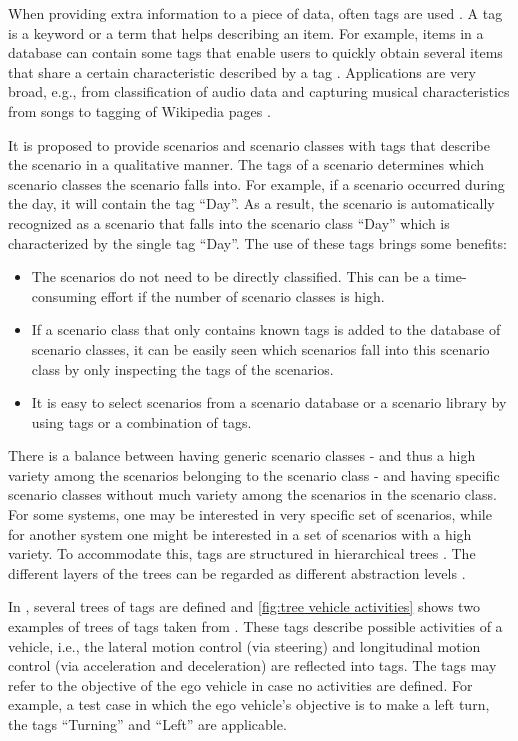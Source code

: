 When providing extra information to a piece of data, often tags are used \cite{smith2007tagging}. A tag is a keyword or a term that helps describing an item. For example, items in a database can contain some tags that enable users to quickly obtain several items that share a certain characteristic described by a tag \cite{craft2004tagging, vasquez2019controlling}. Applications are very broad, e.g., from classification of audio data \cite{kong2017joint} and capturing musical characteristics from songs \cite{ellis2011semantic} to tagging of Wikipedia pages \cite{voss2006collaborative}.

It is proposed to provide scenarios and scenario classes with tags that describe the scenario in a qualitative manner. The tags of a scenario determines which scenario classes the scenario falls into. For example, if a scenario occurred during the day, it will contain the tag ``Day''. As a result, the scenario is automatically recognized as a scenario that falls into the scenario class ``Day'' which is characterized by the single tag ``Day''. The use of these tags brings some benefits:
\begin{itemize}
	\item The scenarios do not need to be directly classified. This can be a time-consuming effort if the number of scenario classes is high.
	\item If a scenario class that only contains known tags is added to the database of scenario classes, it can be easily seen which scenarios fall into this scenario class by only inspecting the tags of the scenarios.
	\item It is easy to select scenarios from a scenario database or a scenario library by using tags or a combination of tags.
\end{itemize}

There is a balance between having generic scenario classes - and thus a high variety among the scenarios belonging to the scenario class - and having specific scenario classes without much variety among the scenarios in the scenario class. For some systems, one may be interested in very specific set of scenarios, while for another system one might be interested in a set of scenarios with a high variety. To accommodate this, tags are structured in hierarchical trees \cite{molloy2017dynamic, badger2012dynamic}. The different layers of the trees can be regarded as different abstraction levels \cite{Bonnin2014}. 

In \cite{degelder2019scenarioclasses}, several trees of tags are defined and \cref{fig:tree vehicle activities} shows two examples of trees of tags taken from \cite{degelder2019scenarioclasses}. These tags describe possible activities of a vehicle, i.e., the lateral motion control (via steering) and longitudinal motion control (via acceleration and deceleration) are reflected into tags. The tags may refer to the objective of the ego vehicle in case no activities are defined. For example, a test case in which the ego vehicle's objective is to make a left turn, the tags ``Turning'' and ``Left'' are applicable. 

